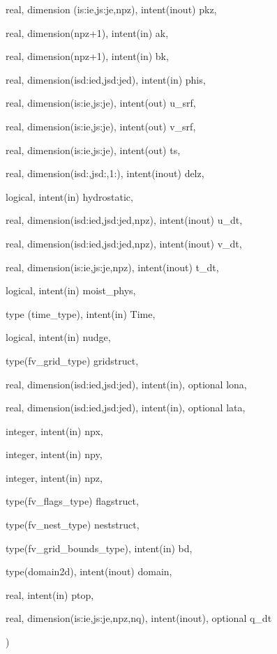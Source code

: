 {\begin{DoxyParamCaption}
\item[{real, dimension (is\-:ie,js\-:je,npz), intent(inout)}]{pkz, }
\item[{real, dimension(npz+1), intent(in)}]{ak, }
\item[{real, dimension(npz+1), intent(in)}]{bk, }
\item[{real, dimension(isd\-:ied,jsd\-:jed), intent(in)}]{phis, }
\item[{real, dimension(is\-:ie,js\-:je), intent(out)}]{u\-\_\-srf, }
\item[{real, dimension(is\-:ie,js\-:je), intent(out)}]{v\-\_\-srf, }
\item[{real, dimension(is\-:ie,js\-:je), intent(out)}]{ts, }
\item[{real, dimension(isd\-:,jsd\-:,1\-:), intent(inout)}]{delz, }
\item[{logical, intent(in)}]{hydrostatic, }
\item[{real, dimension(isd\-:ied,jsd\-:jed,npz), intent(inout)}]{u\-\_\-dt, }
\item[{real, dimension(isd\-:ied,jsd\-:jed,npz), intent(inout)}]{v\-\_\-dt, }
\item[{real, dimension(is\-:ie,js\-:je,npz), intent(inout)}]{t\-\_\-dt, }
\item[{logical, intent(in)}]{moist\-\_\-phys, }
\item[{type (time\-\_\-type), intent(in)}]{Time, }
\item[{logical, intent(in)}]{nudge, }
\item[{type(fv\-\_\-grid\-\_\-type)}]{gridstruct, }
\item[{real, dimension(isd\-:ied,jsd\-:jed), intent(in), optional}]{lona, }
\item[{real, dimension(isd\-:ied,jsd\-:jed), intent(in), optional}]{lata, }
\item[{integer, intent(in)}]{npx, }
\item[{integer, intent(in)}]{npy, }
\item[{integer, intent(in)}]{npz, }
\item[{type(fv\-\_\-flags\-\_\-type)}]{flagstruct, }
\item[{type(fv\-\_\-nest\-\_\-type)}]{neststruct, }
\item[{type(fv\-\_\-grid\-\_\-bounds\-\_\-type), intent(in)}]{bd, }
\item[{type(domain2d), intent(inout)}]{domain, }
\item[{real, intent(in)}]{ptop, }
\item[{real, dimension(is\-:ie,js\-:je,npz,nq), intent(inout), optional}]{q\-\_\-dt}
\end{DoxyParamCaption}
)}\label{classfv__update__phys__mod_a07d63d9929b6cb44156f6ceb8bc27728}

